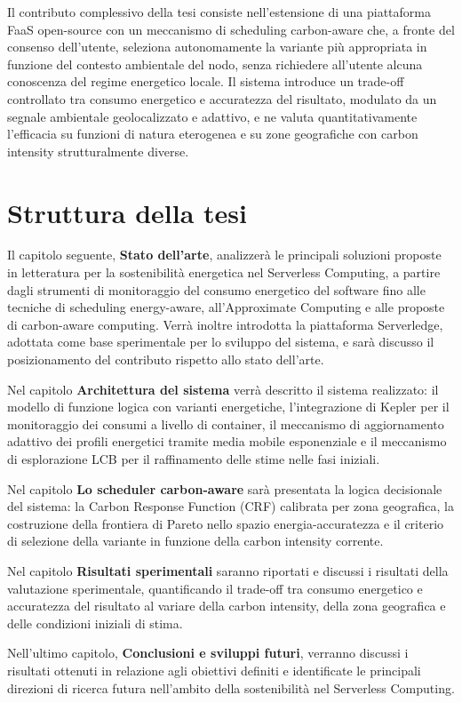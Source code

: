 Il contributo complessivo della tesi consiste nell'estensione di una piattaforma FaaS
open-source con un meccanismo di scheduling carbon-aware che, a fronte del consenso
dell'utente, seleziona autonomamente la variante più appropriata in funzione del
contesto ambientale del nodo, senza richiedere all'utente alcuna conoscenza del regime
energetico locale.
Il sistema introduce un trade-off controllato tra consumo energetico e accuratezza del
risultato, modulato da un segnale ambientale geolocalizzato e adattivo, e ne valuta
quantitativamente l'efficacia su funzioni di natura eterogenea e su zone geografiche
con carbon intensity strutturalmente diverse.

\section{Struttura della tesi}

Il capitolo seguente, \textbf{Stato dell'arte}, analizzerà le principali soluzioni proposte in letteratura per la sostenibilità energetica nel Serverless Computing, a partire dagli strumenti di monitoraggio del consumo energetico del software fino alle tecniche di scheduling energy-aware, all'Approximate Computing e alle proposte di carbon-aware computing. Verrà inoltre introdotta la piattaforma Serverledge, adottata come base sperimentale per lo sviluppo del sistema, e sarà discusso il posizionamento del contributo rispetto allo stato dell'arte.

Nel capitolo \textbf{Architettura del sistema} verrà descritto il sistema realizzato: il modello di funzione logica con varianti energetiche, l'integrazione di Kepler per il monitoraggio dei consumi a livello di container, il meccanismo di aggiornamento adattivo dei profili energetici tramite media mobile esponenziale e il meccanismo di esplorazione LCB per il raffinamento delle stime nelle fasi iniziali.

Nel capitolo \textbf{Lo scheduler carbon-aware} sarà presentata la logica decisionale del sistema: la Carbon Response Function (CRF) calibrata per zona geografica, la costruzione della frontiera di Pareto nello spazio energia-accuratezza e il criterio di selezione della variante in funzione della carbon intensity corrente.

Nel capitolo \textbf{Risultati sperimentali} saranno riportati e discussi i risultati della valutazione sperimentale, quantificando il trade-off tra consumo energetico e accuratezza del risultato al variare della carbon intensity, della zona geografica e delle condizioni iniziali di stima.

Nell'ultimo capitolo, \textbf{Conclusioni e sviluppi futuri}, verranno discussi i risultati ottenuti in relazione agli obiettivi definiti e identificate le principali direzioni di ricerca futura nell'ambito della sostenibilità nel Serverless Computing.
